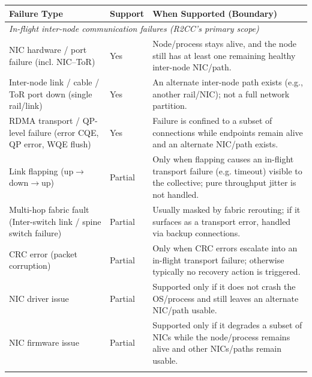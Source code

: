 \documentclass[letterpaper,twocolumn,10pt]{article}
\begin{document}
\begin{table}[!t]
\centering
\begin{tabular}{p{}p{}p{}}
\toprule
\textbf{Failure Type} & \textbf{Support} & \textbf{When Supported (Boundary)} \\
\midrule

\multicolumn{3}{l}{\textit{In-flight inter-node communication failures (R2CC’s primary scope)}} \\
\midrule
NIC hardware / port failure (incl. NIC--ToR) & Yes &
Node/process stays alive, and the node still has at least one remaining healthy inter-node NIC/path. \\
\addlinespace

Inter-node link / cable / ToR port down (single rail/link) & Yes &
An alternate inter-node path exists (e.g., another rail/NIC); not a full network partition. \\
\addlinespace

RDMA transport / QP-level failure (error CQE, QP error, WQE flush) & Yes &
Failure is confined to a subset of connections while endpoints remain alive and an alternate NIC/path exists. \\
\addlinespace

Link flapping (up$\rightarrow$down$\rightarrow$up) & Partial &
Only when flapping causes an in-flight transport failure (e.g. timeout) visible to the collective; pure throughput jitter is not handled. \\
\addlinespace

Multi-hop fabric fault (Inter-switch link / spine switch failure) & Partial &
Usually masked by fabric rerouting; if it surfaces as a transport error, handled via backup connections. \\
\addlinespace

CRC error (packet corruption) & Partial &
Only when CRC errors escalate into an in-flight transport failure; otherwise typically no recovery action is triggered. \\
\addlinespace

NIC driver issue & Partial &
Supported only if it does not crash the OS/process and still leaves an alternate NIC/path usable. \\
\addlinespace

NIC firmware issue & Partial &
Supported only if it degrades a subset of NICs while the node/process remains alive and other NICs/paths remain usable. \\
\addlinespace


\end{tabular}
\end{table}
\end{document}
